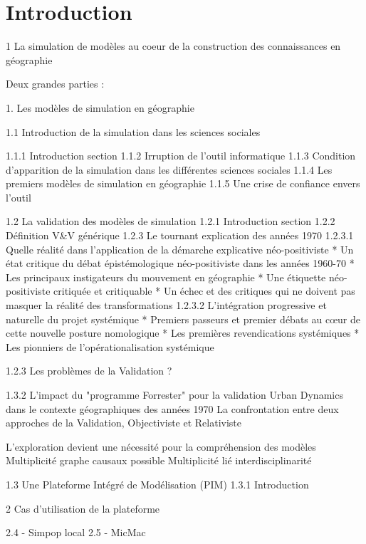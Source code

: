 
\chapter{Introduction}

\startcontents[chapters]
\Mprintcontents


1 La simulation de modèles au coeur de la construction des connaissances en géographie

Deux grandes parties : 

1. Les modèles de simulation en géographie

1.1 Introduction de la simulation dans les sciences sociales 
	
	1.1.1 Introduction section
	1.1.2 Irruption de l'outil informatique
	1.1.3 Condition d'apparition de la simulation dans les différentes sciences sociales
	1.1.4 Les premiers modèles de simulation en géographie
	1.1.5 Une crise de confiance envers l'outil

1.2 La validation des modèles de simulation
	1.2.1 Introduction section
	1.2.2 Définition V&V générique
	1.2.3 Le tournant explication des années 1970
		1.2.3.1 Quelle réalité dans l'application de la démarche explicative néo-positiviste
			* Un état critique du débat épistémologique néo-positiviste dans les années 1960-70
			* Les principaux instigateurs du mouvement en géographie
			* Une étiquette néo-positiviste critiquée et critiquable
			* Un échec et des critiques qui ne doivent pas masquer la réalité des transformations
		1.2.3.2 L'intégration progressive et naturelle du projet systémique
			* Premiers passeurs et premier débats au cœur de cette nouvelle posture nomologique
			* Les premières revendications systémiques
			* Les pionniers de l'opérationalisation systémique

	1.2.3 Les problèmes de la Validation ?
	
		1.3.2 L'impact du "programme Forrester" pour la validation
			Urban Dynamics dans le contexte géographiques des années 1970
			La confrontation entre deux approches de la Validation, Objectiviste et Relativiste
	

L'exploration devient une nécessité pour la compréhension des modèles
	Multiplicité graphe causaux possible
	Multiplicité lié interdisciplinarité

1.3 Une Plateforme Intégré de Modélisation (PIM)
	1.3.1 Introduction

2 Cas d'utilisation de la plateforme

2.4 - Simpop local
2.5 - MicMac 

